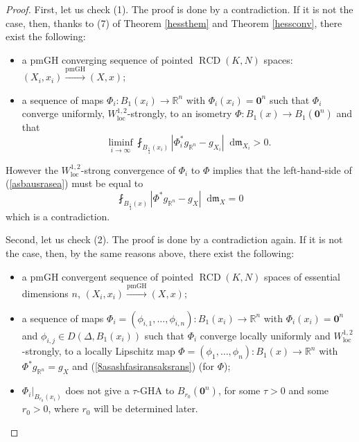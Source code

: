 \documentclass[11pt,reqno]{amsart}
\theoremstyle{definition}
\numberwithin{equation}{section}
\newcommand{\bo}{\bm{0}}
\newcommand{\di}{\mathop{}\!\mathrm{d}}
\newcommand{\meas}{\mathfrak{m}}
\DeclareMathOperator{\loc}{loc}
\DeclareMathOperator{\RCD}{RCD}
\begin{document}
\begin{proof}
    First, let us check (1). The proof is done by a contradiction. If it is not the case, then, thanks to (7) of Theorem \ref{hessthem} and Theorem \ref{hessconv}, there exist the following:
    \begin{itemize}
        \item a pmGH converging sequence of pointed $\RCD(K, N)$ spaces:
    $
        (X_i, x_i) \stackrel{\mathrm{pmGH}}{\to} (X, x);
    $
        \item a sequence of maps $\Phi_i:B_1(x_i) \to \mathbb{R}^n$ with $\Phi_i(x_i)=\bo^n$ such that $\Phi_i$ converge uniformly, $W^{1,2}_{\loc}$-strongly, to an isometry $\Phi:B_1(x) \to B_1(\bo^n)$ and that 
\begin{equation}\label{asbausrasea}
    \liminf_{i\to \infty}\fint_{B_{\frac{1}{4}}(x_i)}|\Phi_i^*g_{\mathbb{R}^n}-g_{X_i}|\di \meas_{X_i}>0.
\end{equation}
    \end{itemize}
However the $W^{1,2}_{\loc}$-strong convergence of $\Phi_i$ to $\Phi$ implies that the left-hand-side of (\ref{asbausrasea}) must be equal to
\begin{equation}
    \fint_{B_{\frac{1}{4}}(x)}|\Phi^*g_{\mathbb{R}^n}-g_X|\di \meas_X=0
\end{equation}
which is a contradiction.

    Second, let us check (2). The proof is done by a contradiction again. If it is not the case, then, by the same reasons above, there exist the following:
    \begin{itemize}
        \item a pmGH convergent sequence of pointed $\RCD(K, N)$ spaces of essential dimensions $n$,
    $
        (X_i, x_i) \stackrel{\mathrm{pmGH}}{\to} (X, x);
    $
        \item a sequence of maps $\Phi_i=(\phi_{i, 1}, \ldots, \phi_{i,n}):B_1(x_i) \to \mathbb{R}^n$ with $\Phi_i(x_i)=\bo^n$ and $\phi_{i, j} \in D(\Delta, B_1(x_i))$ such that $\Phi_i$ converge locally uniformly and $W^{1,2}_{\loc}$-strongly, to a locally Lipschitz map $\Phi=(\phi_1, \ldots, \phi_n):B_1(x) \to \mathbb{R}^n$ with  
        $\Phi^*g_{\mathbb{R}^n}=g_X$ and (\ref{8asashfasiransaksrans}) (for $\Phi$); 
        \item $\Phi_i|_{B_{r_0}(x_i)}$ does not give a $\tau$-GHA to $B_{r_0}(\bo^n)$, for some $\tau>0$ and some $r_0>0$, where $r_0$ will be determined later.
    \end{itemize}   



\end{proof}
\end{document}
